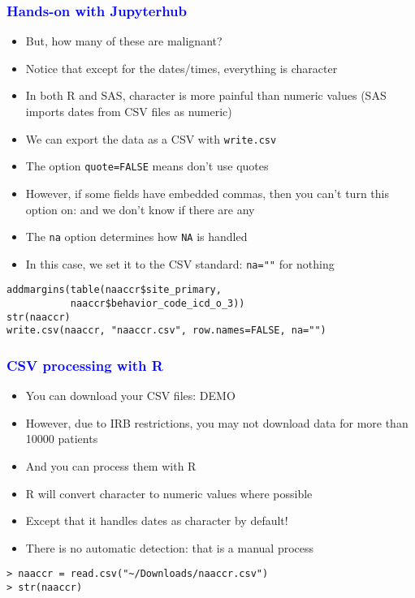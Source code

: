 \documentclass[11pt,pdftex,dvipsnames,usenames]{beamer}
\begin{document}
\begin{frame}[fragile]\frametitle{\bf\textcolor{blue}{Hands-on with Jupyterhub}}
\begin{itemize}
\item But, how many of these are malignant?
\item Notice that except for the dates/times,
everything is character
\item In both R and SAS, character is more painful than numeric
values (SAS imports dates from CSV files as numeric)
\item We can export the data as a CSV with \texttt{write.csv}
\item The option \texttt{quote=FALSE} means don't use quotes
\item However, if some fields have embedded commas, then you
can't turn this option on: and we don't know if there are any
\item The \texttt{na} option determines how \texttt{NA} is handled
\item In this case, we set it to the CSV standard: \texttt{na=""}
for nothing 
\end{itemize}
\begin{verbatim}
addmargins(table(naaccr$site_primary, 
           naaccr$behavior_code_icd_o_3))
str(naaccr)
write.csv(naaccr, "naaccr.csv", row.names=FALSE, na="") 
\end{verbatim}
\end{frame}


\begin{frame}[fragile]\frametitle{\bf\textcolor{blue}{CSV processing with R}}
\begin{itemize}
\item You can download your CSV files: DEMO
\item However, due to IRB restrictions, you may not download data
for more than 10000 patients
\item And you can process them with R
\item R will convert character to numeric values where possible
\item Except that it handles dates as character by default!
\item There is no automatic detection: that is a manual process
\end{itemize}
\begin{verbatim}
> naaccr = read.csv("~/Downloads/naaccr.csv")
> str(naaccr)
\end{verbatim}

\end{frame}
\end{document}
